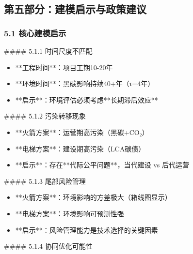 \documentclass[a4paper,12pt]{article}
\begin{document}
\par
\subsection{第五部分：建模启示与政策建议}
\subsubsection{5.1 核心建模启示}
#### 5.1.1 时间尺度不匹配

\par
\begin{itemize}
\item **工程时间**：项目工期10-20年
\end{itemize}
\begin{itemize}
\item **环境时间**：黑碳影响持续40+年（τ=4年）
\end{itemize}
\begin{itemize}
\item **启示**：环境评估必须考虑**长期滞后效应**
\end{itemize}
#### 5.1.2 污染转移现象

\par
\begin{itemize}
\item **火箭方案**：运营期高污染（黑碳+CO₂）
\end{itemize}
\begin{itemize}
\item **电梯方案**：建设期高污染（LCA碳债）
\end{itemize}
\begin{itemize}
\item **启示**：存在**代际公平问题**，当代建设 vs 后代运营
\end{itemize}
#### 5.1.3 尾部风险管理

\par
\begin{itemize}
\item **火箭方案**：环境影响的方差极大（箱线图显示）
\end{itemize}
\begin{itemize}
\item **电梯方案**：环境影响可预测性强
\end{itemize}
\begin{itemize}
\item **启示**：风险管理能力是技术选择的关键因素
\end{itemize}
#### 5.1.4 协同优化可能性
\end{document}
